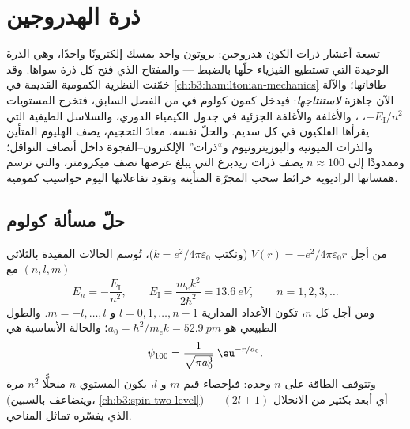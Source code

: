 \chapter{ذرة الهدروجين}\label{ch:b3:hydrogen-atom}

تسعة أعشار ذرات الكون هدروجين: بروتون واحد
يمسك إلكترونًا واحدًا، وهي الذرة الوحيدة التي تستطيع الفيزياء حلّها
بالضبط --- والمفتاح الذي فتح كل ذرة سواها. وقد خمّنت النظرية
الكمومية القديمة في \cref{ch:b3:hamiltonian-mechanics} طاقاتها؛
والآلة الآن جاهزة \emph{لاستنتاجها}: فيدخل كمون
كولوم في  من الفصل السابق، فتخرج
المستويات $-E_{\text{I}}/n^2$، ، والأغلفة
والأغلفة الجزئية في جدول الكيمياء الدوري، والسلاسل الطيفية
التي يقرأها الفلكيون في كل سديم. والحلّ نفسه، معادَ التحجيم،
يصف الهليوم المتأين والذرات الميونية والبوزيترونيوم و``ذرات''
الإلكترون--الفجوة داخل أنصاف النواقل؛ وممدودًا إلى $n
\approx 100$ يصف ذرات ريدبرغ التي يبلغ عرضها نصف ميكرومتر،
والتي ترسم همساتها الراديوية خرائط سحب المجرّة المتأينة وتقود
تفاعلاتها اليوم حواسيب كمومية.

\section{حلّ مسألة كولوم}

\begin{theorem}\label{thm:b3:hydrogen-atom:levels}
من أجل $V(r) = -e^2/4\pi\varepsilon_0 r$ (ونكتب $k = e^2/4\pi
\varepsilon_0$)، تُوسم الحالات المقيدة بالثلاثي $(n, l, m)$ مع
\[
E_n = -\frac{E_{\text{I}}}{n^2} , \qquad
E_{\text{I}} = \frac{m_{\text{e}}k^2}{2\hbar^2} = \qty{13.6}{eV} ,
\qquad n = 1, 2, 3, \dots
\]
ومن أجل كل $n$، تكون الأعداد المدارية $l = 0, 1, \dots, n-1$ و
$m = -l, \dots, l$. والطول الطبيعي هو  $a_0 =
\hbar^2/m_{\text{e}}k = \qty{52.9}{pm}$؛ والحالة الأساسية هي
\[
\psi_{100} = \frac{1}{\sqrt{\pi a_0^3}}\;\eu^{-r/a_0} .
\]
وتتوقف الطاقة على $n$ \emph{وحده}: فبإحصاء قيم $m$ و
$l$، يكون المستوي $n$ منحلًّا $n^2$ مرة (ويتضاعف بالسبين،
\cref{ch:b3:spin-two-level}) --- أي أبعد بكثير من الانحلال
$(2l+1)$ الذي يفسّره تماثل المناحي.
\end{theorem}


